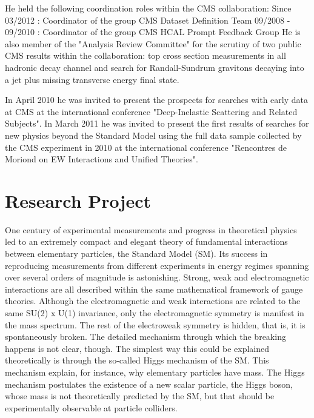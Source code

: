 \documentclass[10pt, a4paper]{article}
\begin{document}
He held the following coordination roles within the CMS collaboration: 
Since 03/2012 : Coordinator of the group CMS Dataset Definition Team 
09/2008 - 09/2010 : Coordinator of the group CMS HCAL Prompt Feedback Group     
He is also member of the "Analysis Review Committee" for the scrutiny of two public CMS results within the collaboration: top cross section measurements in all hadronic decay channel and search for Randall-Sundrum gravitons decaying into a jet plus missing transverse energy final state.

In April 2010 he was invited to present the prospects for searches with early data at CMS at the international conference "Deep-Inelastic Scattering and Related Subjects". 
In March 2011 he was invited to present the first results of searches for new physics beyond the Standard Model using the full data sample collected by the CMS experiment in 2010 at the international conference "Rencontres de Moriond on EW Interactions and Unified Theories".



\section*{Research Project}



One century of experimental measurements and progress in theoretical physics led to an extremely compact and elegant theory of fundamental interactions between elementary particles, the Standard Model (SM). Its success in reproducing measurements from different experiments in energy regimes spanning over several orders of magnitude is astonishing. Strong, weak and electromagnetic interactions are all described within the same mathematical framework of gauge theories. Although the electromagnetic and weak interactions are related to the same SU(2) x U(1) invariance, only the electromagnetic symmetry is manifest in the mass spectrum. The rest of the electroweak symmetry is hidden, that is, it is spontaneously broken. 
The detailed mechanism through which the breaking happens is not clear, though. The simplest way this could be explained theoretically is through the so-called Higgs mechanism of the SM. This mechanism explain, for instance, why elementary particles have mass. The Higgs mechanism postulates the existence of a new scalar particle, the Higgs boson, whose mass is not theoretically predicted by the SM, but that should be experimentally observable at particle colliders. 
\end{document}
